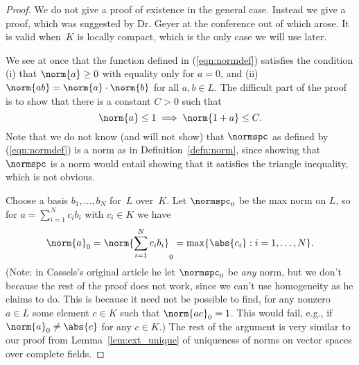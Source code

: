 \documentclass[11pt]{book}
\begin{document}
\begin{ch}
\begin{proof}
\vspace{1ex}  We do not give a proof of
existence in the general case.  Instead we give a proof, which was
suggested by Dr. Geyer at the conference out of which
\cite{cassels:global} arose. It is valid when~$K$ is locally
compact, which is the only case we will use later.

We see at once that the function defined in (\ref{eqn:normdef})
satisfies the condition (i) that $\norm{a}\geq 0$ with equality only
for $a=0$, and (ii) $\norm{ab}=\norm{a}\cdot \norm{b}$ for all $a,b\in
L$.  The difficult part of the proof is to show that there is a
constant $C>0$ such that $$\norm{a}\leq 1 \implies \norm{1+a}\leq C.$$
Note that we do not know (and will not show) that $\normspc$ as
defined by (\ref{eqn:normdef}) is a norm as in
Definition~\ref{defn:norm}, since showing that $\normspc$ is a norm
would entail showing that it satisfies the triangle inequality, which
is not obvious.

Choose a basis $b_1,\ldots, b_N$ for~$L$ over~$K$.  Let $\normspc_0$
be the max norm on $L$, so for $a=\sum_{i=1}^N c_i b_i$ with $c_i\in K$ we have
$$
\norm{a}_0 = \norm{\sum_{i=1}^N c_i b_i}_0 = \max \{\abs{c_i} : i=1,\ldots, N\}.
$$
(Note: in Cassels's original article he let $\normspc_0$ be {\em
  any} norm, but we don't because the rest of the proof does not work,
since we can't use homogeneity as he claims to do.  This is because it need not
be possible to find, for any nonzero $a\in L$ some element $c\in K$ such that
$\norm{ac}_0=1$.  This would fail, e.g., if $\norm{a}_0\neq \abs{c}$
for any $c\in K$.)
The rest of the argument is very similar to our proof from
Lemma~\ref{lem:ext_unique} of uniqueness of norms on vector spaces
over complete fields.


\end{proof}
\end{ch}
\end{document}
